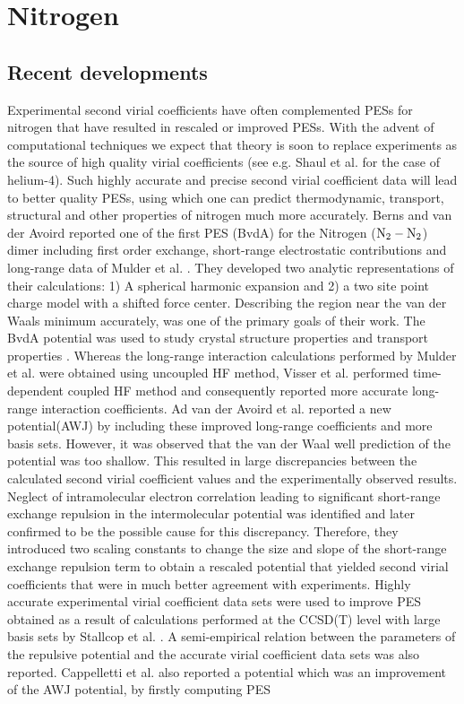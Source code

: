 \chapter{Nitrogen}
\label{chap:n2}
\section{Recent developments}
            Experimental second virial coefficients have often complemented \abinitio{} PESs for nitrogen that have resulted in rescaled or improved PESs. With the advent of computational techniques we expect that theory is soon to replace experiments as the source of high quality virial coefficients (see e.g. Shaul et al. \cite{Shaul2012SC} for the case of helium-4). Such highly accurate and precise second virial coefficient data will lead to better quality PESs, using which one can predict thermodynamic, transport, structural and other properties of nitrogen much more accurately. Berns and van der Avoird \cite{Berns1980} reported one of the first \abinitio{} PES (BvdA) for the Nitrogen (${\rm N_2 - N_2}$) dimer including first order exchange, short-range electrostatic contributions and long-range data of Mulder et al. \cite{Mulder1980}. They developed two analytic representations of their calculations: 1) A spherical harmonic expansion and 2) a two site point charge model with a shifted force center. Describing the region near the van der Waals minimum accurately, was one of the primary goals of their work. The BvdA potential was used to study crystal structure properties \cite{Luty1980} and transport properties \cite{Nyeland1984}. Whereas the long-range interaction calculations performed by Mulder et al. \cite{Mulder1980} were obtained using uncoupled HF method, Visser et al. \cite{Visser1983} performed time-dependent coupled HF method and consequently reported more accurate long-range interaction coefficients. Ad van der Avoird et al. \cite{vanDerAvoird1986} reported a new potential(AWJ) by including these improved long-range coefficients and more basis sets. However, it was observed that the van der Waal well prediction of the potential was too shallow. This resulted in large discrepancies between the calculated second virial coefficient values and the experimentally observed results. Neglect of intramolecular electron correlation leading to significant short-range exchange repulsion in the intermolecular potential was identified and later confirmed to be the possible cause for this discrepancy. Therefore, they introduced two scaling constants to change the size and slope of the short-range exchange repulsion term to obtain a rescaled potential that yielded second virial coefficients that were in much better agreement with experiments. Highly accurate experimental virial coefficient data sets were used to improve \abinitio{} PES obtained as a result of calculations performed at the CCSD(T) level with large basis sets by Stallcop et al. \cite{Stallcop1997}. A semi-empirical relation between the parameters of the repulsive potential and the accurate virial coefficient data sets was also reported. Cappelletti et al. \cite{Cappelletti1998} also reported a potential which was an improvement of the AWJ potential, by firstly computing \abinitio{} PES 